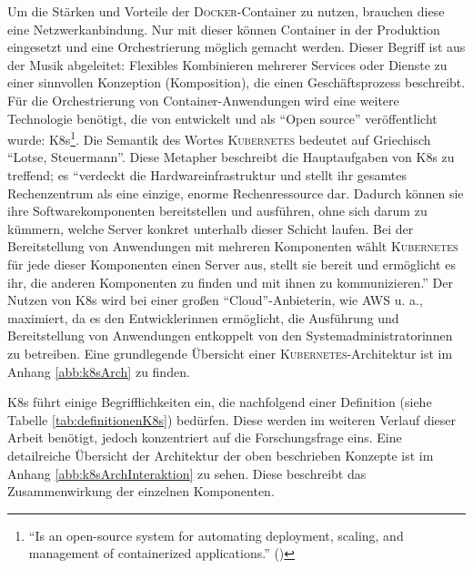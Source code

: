 Um die Stärken und Vorteile der \textsc{Docker}-Container zu nutzen, brauchen diese eine Netzwerkanbindung. Nur mit dieser können Container in der Produktion eingesetzt und eine Orchestrierung möglich gemacht werden. Dieser Begriff ist aus der Musik abgeleitet: Flexibles Kombinieren mehrerer Services oder Dienste zu einer sinnvollen Konzeption (Komposition), die einen Geschäftsprozess beschreibt. Für die Orchestrierung von Container-Anwendungen wird eine weitere Technologie benötigt, die von \cite{google_llc_production-grade_2020} entwickelt und als \enquote{Open source} veröffentlicht wurde: \ac{K8s}\footnote{\enquote{Is an open-source system for automating deployment, scaling, and management of containerized applications.} (\cite{google_llc_production-grade_2020})}. Die Semantik des Wortes \textsc{Kubernetes} bedeutet auf Griechisch \enquote{Lotse, Steuermann}. Diese Metapher beschreibt die Hauptaufgaben von \ac{K8s} zu treffend; es \enquote{verdeckt die Hardwareinfrastruktur und stellt ihr gesamtes Rechenzentrum als eine einzige, enorme Rechenressource dar. Dadurch können sie ihre Softwarekomponenten	bereitstellen und ausführen, ohne sich darum zu kümmern, welche Server konkret unterhalb dieser Schicht laufen. Bei der Bereitstellung von Anwendungen mit mehreren Komponenten wählt \textsc{Kubernetes} für jede dieser Komponenten einen Server aus, stellt sie bereit und ermöglicht es ihr, die anderen Komponenten zu finden und mit ihnen zu kommunizieren.}\autocite[][S.\,4]{luksa_kubernetes_2018} Der Nutzen von \ac{K8s} wird bei einer großen \enquote{Cloud}-Anbieterin, wie \ac{AWS} u. a., maximiert, da es den Entwicklerinnen ermöglicht, die Ausführung und Bereitstellung von Anwendungen entkoppelt von den Systemadministratorinnen zu betreiben.\autocite[vgl.][S.\,4]{luksa_kubernetes_2018} Eine grundlegende Übersicht einer \textsc{Kubernetes}-Architektur ist im Anhang \vref{abb:k8sArch} zu finden.
\par
\ac{K8s} führt einige Begrifflichkeiten ein, die nachfolgend einer Definition\autocite[][S.\,10-14]{caban_architecting_2019} (siehe Tabelle \ref{tab:definitionenK8s}) bedürfen. Diese werden im weiteren Verlauf dieser Arbeit benötigt, jedoch konzentriert auf die Forschungsfrage eins. Eine detailreiche Übersicht der Architektur der oben beschrieben Konzepte ist im Anhang \vref{abb:k8sArchInteraktion} zu sehen. Diese beschreibt das Zusammenwirkung der einzelnen Komponenten.
\par

